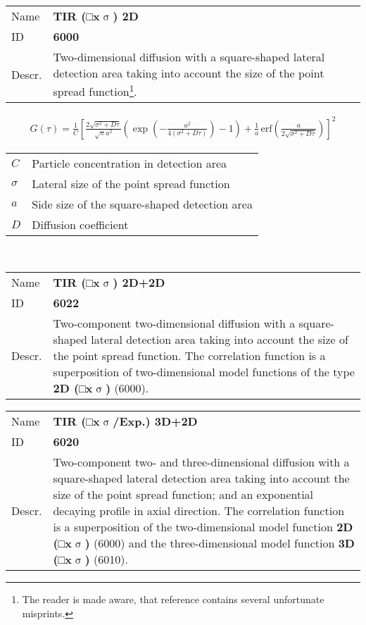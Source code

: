 \noindent \begin{tabular}{lp{}}
Name & \textbf{TIR (□x$\upsigma$) 2D} \\ 
ID & \textbf{6000} \\ 
Descr. &  Two-dimensional diffusion with a square-shaped lateral detection area taking into account the size of the point spread function\cite{Ries2008, Yordanov2011}\footnote{The reader is made aware, that reference \cite{Ries2008} contains several unfortunate misprints.}. \\ 
\end{tabular}
\begin{align}
G(\tau) = \frac{1}{C} \left[
\frac{2 \sqrt{\sigma^2+D \tau}}{\sqrt{\pi} a^2}
\left( \exp\left(-\frac{a^2}{4(\sigma^2+D \tau)}\right) - 1 \right) +
\frac{1}{a} \, \mathrm{erf}\left(\frac{a}{2 \sqrt{\sigma^2+D \tau}}\right)
\right]^2
\end{align} 
\begin{center}
\begin{tabular}{ll}
$C$ & Particle concentration in detection area \\ 
$\sigma$ & Lateral size of the point spread function \\ 
$a$ & Side size of the square-shaped detection area \\
$D$ & Diffusion coefficient \\
\end{tabular} \\
\end{center}
\vspace{2em}


\noindent \begin{tabular}{lp{}}
Name & \textbf{TIR (□x$\upsigma$) 2D+2D} \\ 
ID & \textbf{6022} \\ 
Descr. &  Two-component two-dimensional diffusion with a square-shaped lateral detection area taking into account the size of the point spread function. \newline
The correlation function is a superposition of two-dimensional model functions of the type \textbf{2D (□x$\upsigma$)} (6000)\cite{Ries2008, Yordanov2011}. \\
\end{tabular}
\vspace{2em}


\noindent \begin{tabular}{lp{}}
Name & \textbf{TIR (□x$\upsigma$/Exp.) 3D+2D} \\ 
ID & \textbf{6020} \\ 
Descr. &  Two-component two- and three-dimensional diffusion with a square-shaped lateral detection area taking into account the size of the point spread function; and an exponential decaying profile in axial direction.  \newline
The correlation function is a superposition of the two-dimensional model function \textbf{2D (□x$\upsigma$)} (6000) and the three-dimensional model function \textbf{3D (□x$\upsigma$)} (6010)\cite{Ries2008, Yordanov2011}.
\end{tabular}
\vspace{2em}


